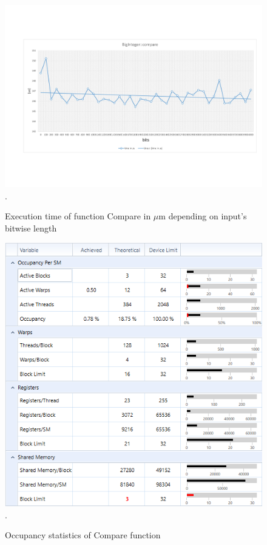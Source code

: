 \documentclass[oneside,openright,12pt,final,en]{mgr}
\begin{document}
\begin{figure}[H]
	\centering
	\includegraphics[width=\textwidth,trim={0 2.5cm 0 2.5cm},clip]{compare.pdf}.
	\caption{Execution time of function Compare in $\mu$m depending on input's bitwise length}
	\label{fig:compare}
\end{figure}

\begin{figure}[H]
	\centering
	\includegraphics[width=\textwidth]{compare_occupancy}.
	\caption{Occupancy statistics of Compare function}
	\label{fig:compare_occupancy}
\end{figure}
\end{document}
